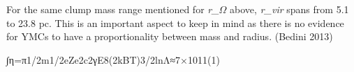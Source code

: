For the same clump mass range mentioned for \textit{r_{$\Omega$}} above, \textit{r_{vir}} spans from 5.1 to 23.8 pc. This is an important aspect to keep in mind as there is no evidence for YMCs to have a proportionality between mass and radius. (Bedini 2013)

∫η=π1/2m1/2eZe2c2γE8(2kBT)3/2lnΛ≈7×1011(1)

